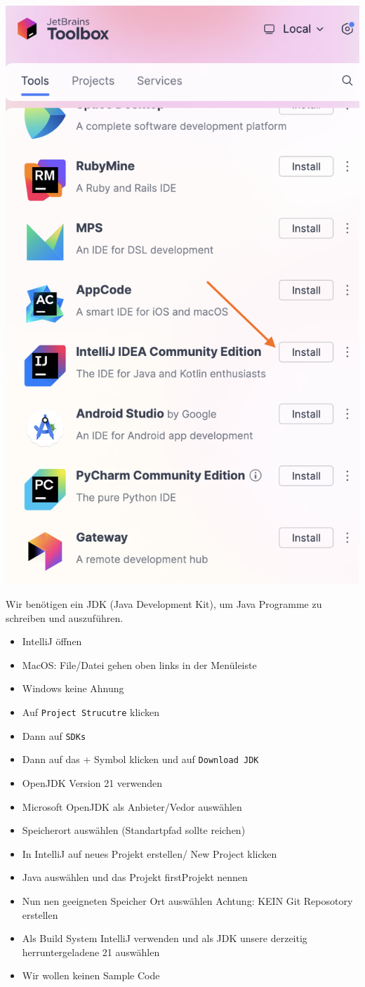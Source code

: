 \documentclass{../sheet}
\begin{document}
\includegraphics[width=0.5\linewidth]{img/IntelliJDownload.png}

\newpage

Wir benötigen ein JDK (Java Development Kit), um Java Programme zu schreiben und
auszuführen.
\begin{itemize}
    \item IntelliJ öffnen
    \item MacOS: File/Datei gehen oben links in der Menüleiste
    \item Windows keine Ahnung
    \item Auf \texttt{Project Strucutre} klicken 
    \item Dann auf \texttt{SDKs}
    \item Dann auf das + Symbol klicken und auf \texttt{Download JDK} 
    \item OpenJDK Version 21 verwenden
    \item Microsoft OpenJDK als Anbieter/Vedor auswählen
    \item Speicherort auswählen (Standartpfad sollte reichen)
\end{itemize}

\newpage

\begin{itemize}
    \item In IntelliJ auf neues Projekt erstellen/ New Project klicken
    \item Java auswählen und das Projekt firstProjekt nennen
    \item Nun nen geeigneten Speicher Ort auswählen Achtung: KEIN Git Reposotory erstellen
    \item Als Build System IntelliJ verwenden und als JDK unsere derzeitig herruntergeladene 21 auswählen
    \item Wir wollen keinen Sample Code
\end{itemize}
\end{document}
